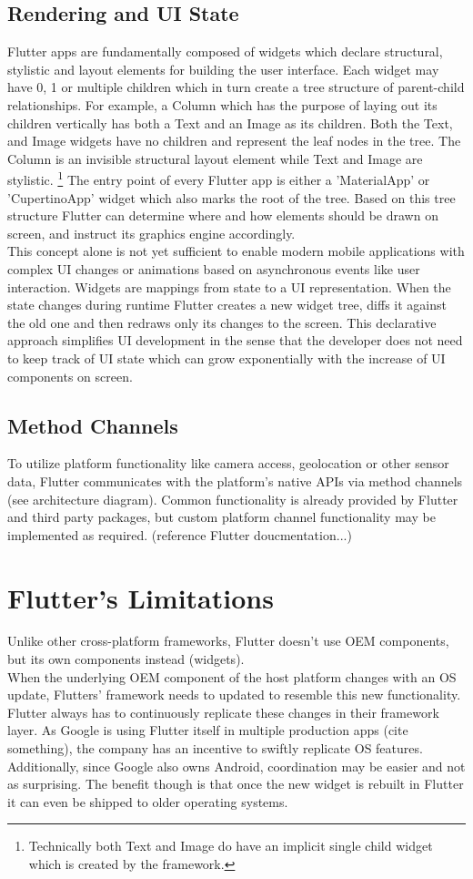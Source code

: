 \subsection{Rendering and UI State}
Flutter apps are fundamentally composed of widgets which declare structural, stylistic and layout elements for building the user interface. 
Each widget may have 0, 1 or multiple children which in turn create a tree structure of parent-child relationships. 
For example, a Column which has the purpose of laying out its children vertically has both a Text and an Image as its children. Both the Text,
and Image widgets have no children and represent the leaf nodes in the tree. The Column is an invisible structural layout element while Text and 
Image are stylistic.
\footnote{Technically both Text and Image do have an implicit single child widget which is created by the framework.}
The entry point of every Flutter app is either a 'MaterialApp' or 'CupertinoApp' widget which also marks the root of the tree.
Based on this tree structure Flutter can determine where and how elements should be drawn on screen, and instruct its graphics engine accordingly.\\
This concept alone is not yet sufficient to enable modern mobile applications with complex UI changes or animations 
based on asynchronous events like user interaction. 
Widgets are mappings from state to a UI representation. When the state changes during runtime Flutter creates a new widget tree, 
diffs it against the old one and then redraws only its changes to the screen.
This declarative approach simplifies UI development in the sense that the developer does not need to keep track of UI state which can grow exponentially
with the increase of UI components on screen. 

\subsection{Method Channels}
To utilize platform functionality like camera access, geolocation or other sensor data, Flutter communicates with the platform's native APIs via 
method channels (see architecture diagram). Common functionality is already provided by Flutter and third party packages, but custom platform channel
functionality may be implemented as required. (reference Flutter doucmentation...)

\section{Flutter's Limitations}
Unlike other cross-platform frameworks, Flutter doesn't use OEM components, but its own components instead (widgets).\\
When the underlying OEM component of the host platform changes with an OS update, Flutters' framework needs to updated to resemble this new 
functionality. Flutter always has to continuously replicate these changes in their framework layer. As Google is using Flutter itself in multiple 
production apps (cite something), the company has an incentive to swiftly replicate OS features. Additionally, since Google also owns Android, 
coordination may be easier and not as surprising.
The benefit though is that once the new widget is rebuilt in Flutter it can even be shipped to older operating systems.
